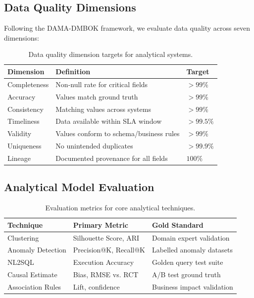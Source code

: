 \documentclass[12pt, a4paper]{article}
\begin{document}
\subsection{Data Quality Dimensions}
Following the DAMA-DMBOK framework, we evaluate data quality across seven dimensions:

\begin{table}[ht]
\centering
\caption{Data quality dimension targets for analytical systems.}
\label{tab:data-quality}
\begin{tabular}{lll}
\toprule
\textbf{Dimension} & \textbf{Definition} & \textbf{Target} \\
\midrule
Completeness & Non-null rate for critical fields     & $>99\%$ \\
Accuracy     & Values match ground truth              & $>99\%$ \\
Consistency  & Matching values across systems         & $>99\%$ \\
Timeliness   & Data available within SLA window       & $>99.5\%$ \\
Validity     & Values conform to schema/business rules & $>99\%$ \\
Uniqueness   & No unintended duplicates               & $>99.9\%$ \\
Lineage      & Documented provenance for all fields   & $100\%$ \\
\bottomrule
\end{tabular}
\end{table}

\subsection{Analytical Model Evaluation}

\begin{table}[ht]
\centering
\caption{Evaluation metrics for core analytical techniques.}
\label{tab:model-eval}
\begin{tabular}{lll}
\toprule
\textbf{Technique} & \textbf{Primary Metric} & \textbf{Gold Standard} \\
\midrule
Clustering     & Silhouette Score, ARI & Domain expert validation \\
Anomaly Detection & Precision@K, Recall@K & Labelled anomaly datasets \\
NL2SQL         & Execution Accuracy    & Golden query test suite \\
Causal Estimate & Bias, RMSE vs. RCT    & A/B test ground truth \\
Association Rules & Lift, confidence    & Business impact validation \\
\bottomrule
\end{tabular}
\end{table}
\end{document}
